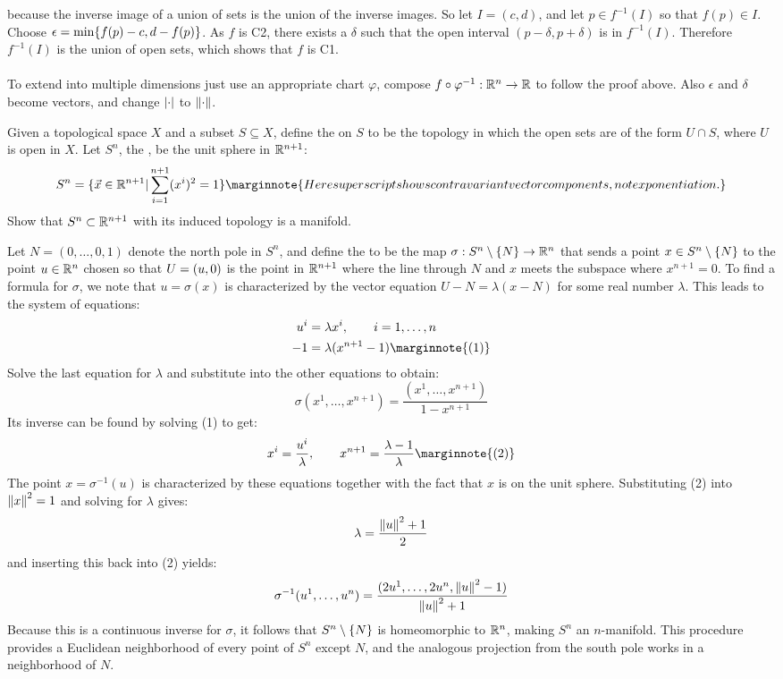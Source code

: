 \documentclass[10pt]{article}
\begin{document}
 because the inverse image of a union of sets is the union of the inverse images. So let $I = (c,d)$,
 and let $p\in f^{-1}(I)$ so that $f(p)\in I$. Choose $\epsilon=\min\lbrace f(p)-c,d- f(p)\rbrace$. As $f$ is C2, there
 exists a $\delta$ such that the open interval $(p - \delta, p + \delta)$ is in $f^{-1}(I)$. Therefore $f^{-1}(I)$
  is the union of open sets, which shows that $f$ is C1.\\\\
  To extend into multiple dimensions just use an appropriate chart $\varphi$, compose
 $f \circ \varphi^{-1}: \mathbb{R}^n \to \mathbb{R}$ to follow the proof above. Also $\epsilon$ and $\delta$
  become vectors, and change $\abs{\cdot}$ to $\norm{\cdot}$.


\begin{example}\label{b1e3}
	Given a topological space $X$ and a subset $S \subseteq X$, define the
	 on $S$ to be the topology in which the open sets are
	of the form $U \cap S$, where $U$ is open in $X$. Let $S^n$, the
	, be the unit sphere in $\mathbb{R}^{n+1}$:
	$$
		S^n = \br{\vec{x} \in \R^{n+1} | \sum_{i=1}^{n+1}\p{x^i}^2=1}
		\marginnote{Here superscript shows contravariant
vector components, not exponentiation.}
	$$
	Show that $S^n \subset \mathbb{R}^{n+1}$ with its induced topology is a manifold.
\end{example}
\sol Let $N = (0,\dots,0,1)$ denote the north pole in $S^n$, and define the
 to be the map $\sigma:S^n\setminus\lbrace N\rbrace\to\mathbb{R}^n$
that sends a point $x \in S^n\setminus\lbrace N\rbrace$ to the point $u\in\mathbb{R}^n$ chosen so that
$U=\lparen u, 0\rparen$ is the point in $\mathbb{R}^{n+1}$ where the line through $N$ and $x$ meets the
subspace where $x^{n+1}=0.$
To find a formula for $\sigma$, we note that $u=\sigma(x)$
is characterized by the vector equation $U-N=\lambda(x-N)$ for some real number $\lambda$.
This leads to the system of equations:
$$
\begin{aligned}
	u^i &= \lambda x^i, \qquad i=1,\dots,n\\
	-1 &= \lambda(x^{n+1} - 1) \marginnote{(1)}
\end{aligned}
$$
Solve the last equation for $\lambda$ and substitute into the other equations to obtain:
$$
	\sigma(x^1,\dots,x^{n+1}) = \frac{(x^1,\dots,x^{n+1})}{1-x^{n+1}}
$$
Its inverse can be found by solving (1) to get:
$$
	x^i = \frac{u^i}{\lambda}, \qquad x^{n+1} = \frac{\lambda-1}{\lambda}
	\marginnote{(2)}
$$
The point $x=\sigma^{-1}(u)$ is characterized by these equations together with the
fact that $x$ is on the unit sphere. Substituting (2) into $\norm{x}^2=1$ and solving
for $\lambda$ gives:
$$
	\lambda=\frac{\norm{u}^2+1}{2}
$$
and inserting this back into (2) yields:
$$
	\sigma^{-1}(u^1,\dots,u^n)=\frac{(2u^1,\dots,2u^n,\norm{u}^2-1)}{\norm{u}^2+1}
$$
Because this is a continuous inverse for $\sigma$, it follows that $S^n\setminus\lbrace N\rbrace$ is homeomorphic to $\mathbb{R}^n$, making $S^n$ an $n$-manifold. This procedure provides a Euclidean neighborhood of
every point of $S^n$ except $N$, and the analogous projection from the south pole
works in a neighborhood of $N$.
\end{document}

